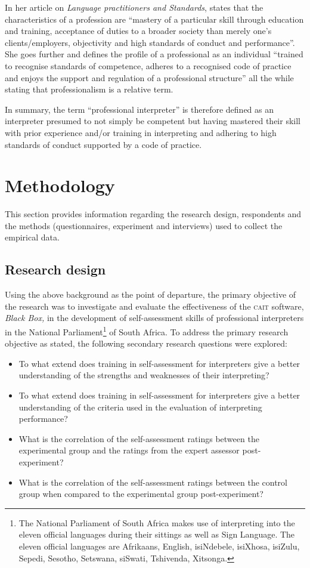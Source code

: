 \documentclass[output=paper]{langsci/langscibook}
\begin{document}
In her article on \textit{Language practitioners and Standards}, \citet[162]{Feinauer2005} states that the characteristics of a profession are “mastery of a particular skill through education and training, acceptance of duties to a broader society than merely one’s clients/employers, objectivity and high standards of conduct and performance”. She goes further and defines the profile of a professional as an individual “trained to recognise standards of competence, adheres to a recognised code of practice and enjoys the support and regulation of a professional structure” all the while stating that professionalism is a relative term. 

In summary, the term “professional interpreter” is therefore defined as an interpreter presumed to not simply be competent but having mastered their skill with prior experience and/or training in interpreting and adhering to high standards of conduct supported by a code of practice. 

\section{Methodology}
This section provides information regarding the research design, respondents and the methods (questionnaires, experiment and interviews) used to collect the empirical data. 

\subsection{Research design} 
Using the above background as the point of departure, the primary objective of the research was to investigate and evaluate the effectiveness of the \textsc{cait} software, \textit{Black Box,} in the development of self-assessment skills of professional interpreters in the National Parliament\footnote{The National Parliament of South Africa makes use of interpreting into the eleven official languages during their sittings as well as Sign Language. The eleven official languages are Afrikaans, English, isiNdebele, isiXhosa, isiZulu, Sepedi, Sesotho, Setswana, siSwati, Tshivenda, Xitsonga.}  of South Africa. To address the primary research objective as stated, the following secondary research questions were explored:

\begin{itemize}
\item To what extend does training in self-assessment for interpreters give a better understanding of the strengths and weaknesses of their interpreting?
\item To what extend does training in self-assessment for interpreters give a better understanding of the criteria used in the evaluation of interpreting performance?
\item What is the correlation of the self-assessment ratings between the experimental group and the ratings from the expert assessor post-experiment?
\item What is the correlation of the self-assessment ratings between the control group when compared to the experimental group post-experiment?
\end{itemize}
\end{document}
